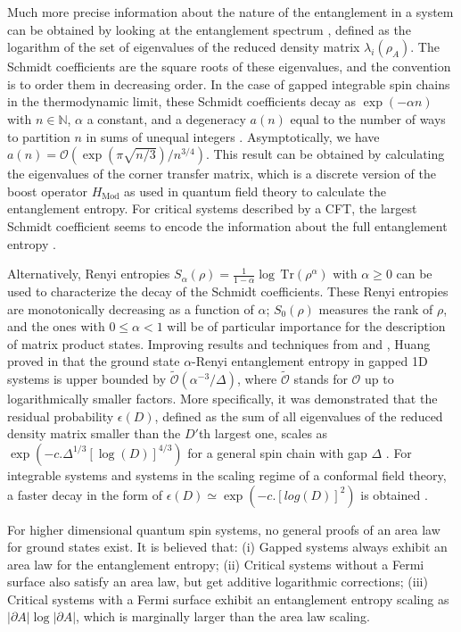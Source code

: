 \documentclass[rmp,aps,reprint,superscriptaddress,nobalancelastpage]{revtex4-1}
\begin{document}
Much more precise information about the nature of the entanglement in a system can be obtained by looking at the entanglement spectrum \cite{li:es-qhe-sphere}, defined as the logarithm of the set of eigenvalues of the reduced density matrix $\lambda_i(\rho_A)$. The Schmidt coefficients are the square roots of these eigenvalues, and the convention is to order them in decreasing order. In the case of gapped integrable spin chains in the thermodynamic limit, these Schmidt coefficients decay as $\exp(-\alpha n)$ with $n\in\mathbb{N}$, $\alpha$ a constant, and a degeneracy $a(n)$ equal to the number of ways to partition $n$ in sums of unequal integers \cite{peschel1999density}. Asymptotically, we have $a(n)=\mathcal{O}\left(\exp(\pi\sqrt{n/3})/n^{3/4}\right)$. This result can be obtained by calculating the eigenvalues of the corner transfer matrix, which is a discrete version of the boost operator $H_\mathrm{Mod}$ as used in quantum field theory to calculate the entanglement entropy. For critical systems described by a CFT, the largest Schmidt coefficient seems to encode the information about the full entanglement entropy \cite{orus2006half}.

Alternatively, Renyi entropies $S_\alpha(\rho)=\tfrac{1}{1-\alpha}\log\,
    \mathrm{Tr}\left(\rho^\alpha\right)$ with $\alpha\ge 0$ can be used to characterize the decay of the Schmidt coefficients. These Renyi entropies are monotonically decreasing as a function of $\alpha$; $S_0(\rho)$ measures the rank of $\rho$, and the ones with $0\leq \alpha<1$ will be of particular importance for the description of matrix product states.
Improving results and techniques from \cite{hastings:arealaw} and \cite{landau:1d-efficient-algo}, Huang proved in \cite{huang:area-law} that the ground state $\alpha$-Renyi entanglement entropy in gapped 1D systems  is upper bounded by $\tilde{\mathcal{O}}(\alpha^{-3}/\Delta)$, where $\tilde{\mathcal{O}}$ stands for $\mathcal{O}$ up to logarithmically smaller factors. More specifically, it was demonstrated that the residual probability $\epsilon(D)$, defined as the sum of all eigenvalues of the reduced density matrix smaller than the $D'$th largest one, scales as $\exp\left(-c.\Delta^{1/3}\left[\log(D)\right]^{4/3}\right)$ for a general spin chain with gap $\Delta$ \cite{arad:1d-arealaw}. For integrable systems and systems in the scaling regime of a conformal field theory, a faster decay in the form of  $\epsilon(D)\simeq\exp(-c.\left[log(D)\right]^2)$ is obtained \cite{Calabrese_Lefevre,verstraete:faithfully}.

For higher dimensional quantum spin systems, no general proofs of an area law for ground states exist. It is believed that: (i) Gapped systems always exhibit an area law for the entanglement entropy; (ii) Critical systems without a Fermi surface also satisfy an area law, but get additive logarithmic corrections; (iii) Critical systems with a Fermi surface exhibit an entanglement entropy scaling as $|\partial A|\log |\partial A|$, which is marginally larger than the area law scaling.
\end{document}

